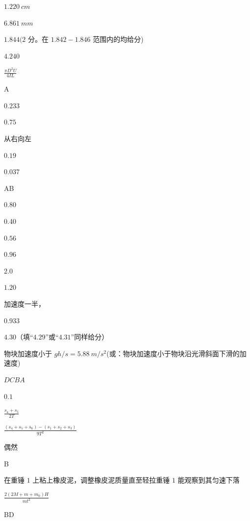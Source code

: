 \item \par 
\item $ 1.220 \ cm $
\item $ 6.861 \ mm $
\item \par 
\item $ 1.844(2 $ 分。在 $ 1.842-1.846 $ 范围内的均给分)
\item $ 4.240 $
\item $\frac {\pi D^{2} U}{4 I L}$
\item A
\item $ 0.233 $
\item $ 0.75 $
\item \par 
\item 从右向左
\item $ 0.19 $
\item $ 0.037 $
\item \par 
\item AB
\item $ 0.80 $
\item 0.40
\item $ 0.56 $
\item $ 0.96 $
\item $ 2.0 $
\item $ 1.20 $
\item 加速度一半，
\item $ 0.933 $
\item \par 
\item $ 4.30 $（填“$ 4.29 $”或“$ 4.31 $”同样给分）
\item 物块加速度小于 $ gh/s=5.88 \ m/s^{2} $(或：物块加速度小于物块沿光滑斜面下滑的加速度)
\item \par 
\item $ DCBA $
\item $ 0.1 $
\item $\frac {s_{4}+s_{5}}{2 T}$
\item $\frac {\left (s_{4}+s_{5}+s_{6}\right )-\left (s_{1}+s_{2}+s_{3}\right )}{9 T^{2}}$
\item 偶然
\item B
\item 在重锤 $ 1 $ 上粘上橡皮泥，调整橡皮泥质量直至轻拉重锤 $ 1 $ 能观察到其匀速下落
\item $\frac {2\left (2 M+m+m_{0}\right ) H}{m t^{2}}$
\item BD

